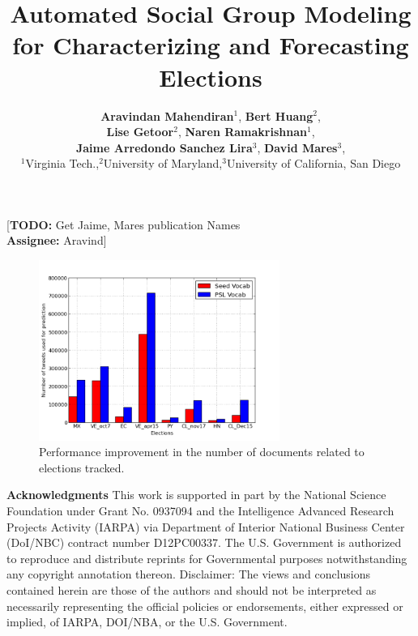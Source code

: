 \documentclass[letterpaper]{article}
\newcommand{\TODO}[2]{{\color{magenta}[\textbf{TODO:} #2 \\ \textbf{Assignee:} #1]}}
\begin{document}
\title{Automated Social Group Modeling for Characterizing and Forecasting Elections}
\author{{\bf Aravindan Mahendiran}$^{1}$, {\bf Bert Huang}$^{2}$,\\
			  {\bf Lise Getoor}$^{2}$, {\bf Naren Ramakrishnan}$^{1}$,\\
			  {\bf Jaime Arredondo Sanchez Lira}$^{3}$, {\bf David Mares}$^{3}$,\\
              $^1$Virginia Tech.,$^2$University of Maryland,$^3$University of California, San Diego}
\maketitle
\TODO{Aravind}{Get Jaime, Mares publication Names}\\



\begin{figure}[Ht]
	\centering
	\includegraphics[width=0.7\textwidth, height=0.3\textheight]{support_files/Recall.png}
\vspace{-1em}
	\caption{Performance improvement in the number of documents related to elections tracked.}
	\label{fig:recall}
	\vspace{-1em}
\end{figure}


\linebreak
\linebreak
\textbf{Acknowledgments}
This work is supported in part by the National Science Foundation under Grant No. 0937094 and the Intelligence Advanced Research Projects Activity (IARPA) via Department of Interior National Business Center (DoI/NBC) contract number D12PC00337. The U.S. Government is authorized to reproduce and distribute reprints for Governmental purposes notwithstanding any copyright annotation thereon. Disclaimer: The views and conclusions contained herein are those of the authors and should not be interpreted as necessarily representing the official policies or endorsements, either expressed or implied, of IARPA, DOI/NBA, or the U.S. Government.
\linebreak
\linebreak
\linebreak
\linebreak


\end{document}
